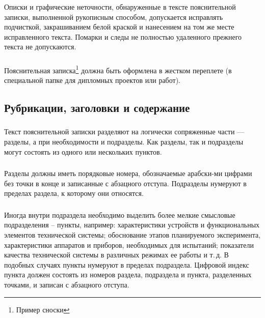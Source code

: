 \subsubsection{} 
Описки и графические неточности, обнаруженные в тексте пояснительной записки, выполненной рукописным способом, допускается исправлять подчисткой, закрашиванием белой краской и нанесением на том же месте исправленного текста. Помарки и следы не полностью удаленного прежнего текста не допускаются.

\subsubsection{} 
Пояснительная записка\footnote{Пример сноски} должна быть оформлена в жестком переплете (в специальной папке для дипломных проектов или работ).


\subsection{Рубрикации, заголовки и содержание}

\subsubsection{} 
Текст пояснительной записки разделяют на логически сопряженные части --- разделы, а при необходимости и подразделы. Как разделы, так и подразделы могут состоять из одного или нескольких пунктов.

\subsubsection{}
Разделы должны иметь порядковые  номера,  обозначаемые арабски-ми цифрами без точки  в конце  и записанные с абзацного отступа. Подразделы 
нумеруют в пределах раздела, к которому они относятся.

\subsubsection{}
Иногда внутри подраздела необходимо выделить более мелкие смысловые подразделения – пункты, например: характеристики устройств и функциональных элементов технической системы; обоснование этапов планируемого эксперимента, характеристики аппаратов и приборов, необходимых для испытаний; показатели качества технической системы в различных режимах ее работы и т.\,д. В подобных случаях пункты нумеруют в пределах подраздела. Цифровой индекс пункта должен состоять из номеров раздела, подраздела и пункта, разделенных точками, и записан с абзацного отступа. 

